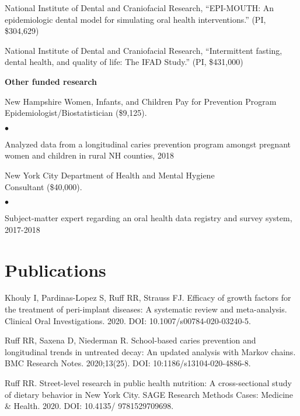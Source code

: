 \documentclass[margin,line]{res}
\newenvironment{list2}{
  \begin{list}{$\bullet$}{%
      \setlength{\itemsep}{0in}
      \setlength{\parsep}{0in} \setlength{\parskip}{0in}
      \setlength{\topsep}{0in} \setlength{\partopsep}{0in} 
      \setlength{\leftmargin}{0.2in}}}{\end{list}}
\begin{document}
\begin{resume}
National Institute of Dental and Craniofacial Research, “EPI-MOUTH: An epidemiologic dental model for simulating oral health interventions.” (PI, \$304,629)
		
National Institute of Dental and Craniofacial Research, “Intermittent fasting, dental health, and quality of life: The IFAD Study.” (PI, \$431,000)

{\bf Other funded research} \hfill 

\vspace*{-2.5mm}
New Hampshire Women, Infants, and Children Pay for Prevention Program \\
Epidemiologist/Biostatistician (\$9,125).
\begin{list2}
\item Analyzed data from a longitudinal caries prevention program amongst pregnant women and children in rural NH counties, 2018
\end{list2}

New York City Department of Health and Mental Hygiene \\
Consultant (\$40,000).
\begin{list2}
\item Subject-matter expert regarding an oral health data registry and survey system, 2017-2018	
\end{list2}


\section{\sc Publications}

Khouly I, Pardinas-Lopez S, Ruff RR, Strauss FJ. Efficacy of growth factors for the
treatment of peri-implant diseases: A systematic review and meta-analysis. Clinical Oral Investigations. 2020. DOI: 10.1007/s00784-020-03240-5.

Ruff RR, Saxena D, Niederman R. School-based caries prevention and longitudinal trends in untreated decay: An updated analysis with Markov chains. BMC Research Notes. 2020;13(25). DOI: 10:1186/s13104-020-4886-8.

Ruff RR. Street-level research in public health nutrition: A cross-sectional study of dietary behavior in New York City. SAGE Research Methods Cases: Medicine \& Health. 2020. DOI: 10.4135/
9781529709698.


\end{resume}
\end{document}
